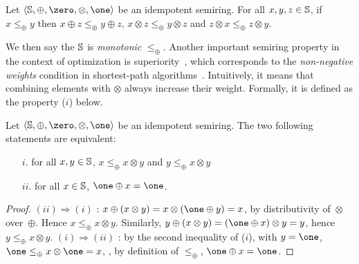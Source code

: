 \begin{lemma} \label{lem:monotonic}
Let $\< \Semiring, \oplus, \zero, \otimes, \one>$ be an idempotent semiring.
For all $x, y, z  \in \mathbb{S}$,
if $x \leq_\oplus y$ then
$x \oplus z \leq_\oplus y \oplus z$,
$x \otimes z \leq_\oplus y \otimes z$
and $z \otimes x \leq_\oplus z \otimes y$.
\end{lemma}

We then say the
$\mathbb{S}$ is \emph{monotonic} \wrt $\leq_\oplus$.
%
Another important semiring property in the context of optimization
is {superiority}~\cite{Huang08advanceddynamic},
which corresponds to the
\emph{non-negative weights} condition in shortest-path algorithms~\cite{Dijkstra59anote}.
Intuitively, it means that combining elements with $\otimes$ always increase their weight.
Formally, it is defined as the property ($i$) below. %

\begin{lemma}
\label{lem:superior}\label{lem:bounded}
Let $\< \Semiring, \oplus, \zero, \otimes, \one>$ be an idempotent semiring.
The two following statements are equivalent:
\begin{itemize}
\item [$i.$] for all $x, y \in \mathbb{S}$,
$x \leq_\oplus x \otimes y$ and
$y \leq_\oplus x \otimes y$
\item[$ii.$] for all $x \in \mathbb{S}$,  $\one \oplus x = \one$.
\end{itemize}
\end{lemma}
%
\begin{proof} %
$(ii) \Rightarrow (i)$ :
$x \oplus (x \otimes y) = x \otimes (\one \oplus y) = x$,
by distributivity of~$\otimes$ over~$\oplus$.
Hence $x \leq_\oplus x \otimes y$.
Similarly, $y \oplus (x \otimes y) = (\one \oplus x) \otimes y = y$,
hence $y \leq_\oplus x \otimes y$.
%
$(i) \Rightarrow (ii)$ :
by the second inequality of ($i$), with $y = \one$,
$\one \leq_\oplus x \otimes \one = x$, \ie,
by definition of $\leq_\oplus$, $\one \oplus x = \one$.
\end{proof}

